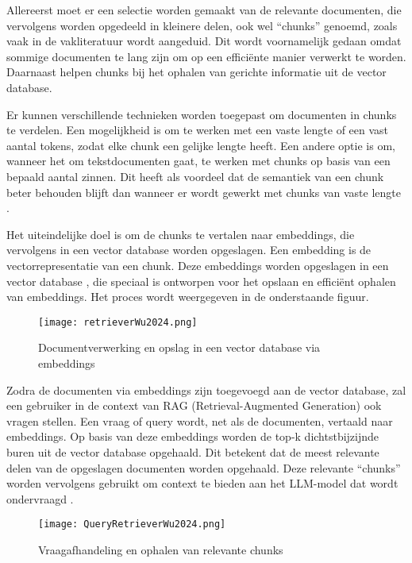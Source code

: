     Allereerst moet er een selectie worden gemaakt van de relevante documenten, die vervolgens worden opgedeeld in kleinere delen, ook wel “chunks” genoemd, zoals vaak in de vakliteratuur wordt aangeduid. Dit wordt voornamelijk gedaan omdat sommige documenten te lang zijn om op een efficiënte manier verwerkt te worden. Daarnaast helpen chunks bij het ophalen van gerichte informatie uit de vector database. 
    
    Er kunnen verschillende technieken worden toegepast om documenten in chunks te verdelen. Een mogelijkheid is om te werken met een vaste lengte of een vast aantal tokens, zodat elke chunk een gelijke lengte heeft. Een andere optie is om, wanneer het om tekstdocumenten gaat, te werken met chunks op basis van een bepaald aantal zinnen. Dit heeft als voordeel dat de semantiek van een chunk beter behouden blijft dan wanneer er wordt gewerkt met chunks van vaste lengte \autocite{Wang2024}.

    Het uiteindelijke doel is om de chunks te vertalen naar embeddings, die vervolgens in een vector database worden opgeslagen. Een embedding is de vectorrepresentatie van een chunk. Deze embeddings worden opgeslagen in een vector database \autocite{Wu2024}, die speciaal is ontworpen voor het opslaan en efficiënt ophalen van embeddings. Het proces wordt weergegeven in de onderstaande figuur.
   
     \begin{figure}[H]
        \centering
        \texttt{[image: retrieverWu2024.png]}
        \caption{Documentverwerking en opslag in een vector database via embeddings \cite{Wu2024}}
        \label{fig:RAG opmaken vector database}
    \end{figure}
    
    Zodra de documenten via embeddings zijn toegevoegd aan de vector database, zal een gebruiker in de context van RAG (Retrieval-Augmented Generation) ook vragen stellen. Een vraag of query wordt, net als de documenten, vertaald naar embeddings. Op basis van deze embeddings worden de top-k dichtstbijzijnde buren uit de vector database opgehaald. Dit betekent dat de meest relevante delen van de opgeslagen documenten worden opgehaald. Deze relevante “chunks” worden vervolgens gebruikt om context te bieden aan het LLM-model dat wordt ondervraagd \autocite{Wu2024}.
    
            
    \begin{figure}[H]
        \centering
        \texttt{[image: QueryRetrieverWu2024.png]}
        \caption{Vraagafhandeling en ophalen van relevante chunks \cite{Wu2024}}
        \label{fig:RAG bevragen vector database}
    \end{figure}
    
